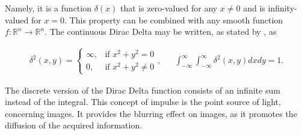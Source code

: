 Namely, it is a function $\delta(x)$ that is zero-valued for any $x \neq 0$ and is infinity-valued for $x = 0$. This property can be combined with any smooth function $f\colon \mathbb{R}^{n} \to \mathbb{R}^{n}$.
The continuous Dirac Delta may be written, as stated by , as

\begin{align}
\label{eqn:dirac_delta_function}
\delta^{2}(x,y)= 
\begin{cases}
    \infty, & \text{if } x^{2} + y^{2} =0\\
    0, & \text{if } x^{2} + y^{2} \neq 0
\end{cases},
&&
\int_{-\infty}^{\infty}
\int_{-\infty}^{\infty}
\delta^{2}(x,y)dxdy = 1.
\end{align}

\noindent The discrete version of the Dirac Delta function consists of an infinite sum instead of the integral. This concept of impulse is the point source of light, concerning images. It provides the blurring effect on images, as it promotes the diffusion of the acquired information.